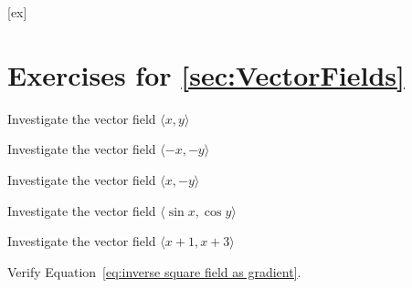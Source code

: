 [ex]
\section*{Exercises for \ref{sec:VectorFields}}

\begin{enumialphparenastyle}

\begin{ex} Investigate the vector field $\langle x,y\rangle$ 
\end{ex}

\begin{ex} Investigate the vector field $\langle -x, -y\rangle$ 
\end{ex}

\begin{ex} Investigate the vector field $\langle x,-y\rangle$ 
\end{ex}

\begin{ex} Investigate the vector field $\langle \sin x,\cos y\rangle$ 
\end{ex}

\begin{ex} Investigate the vector field $\langle x+1,x+3\rangle$ 
\end{ex}

\begin{ex} Verify Equation~\ref{eq:inverse square field as gradient}.
\end{ex}

\end{enumialphparenastyle}
